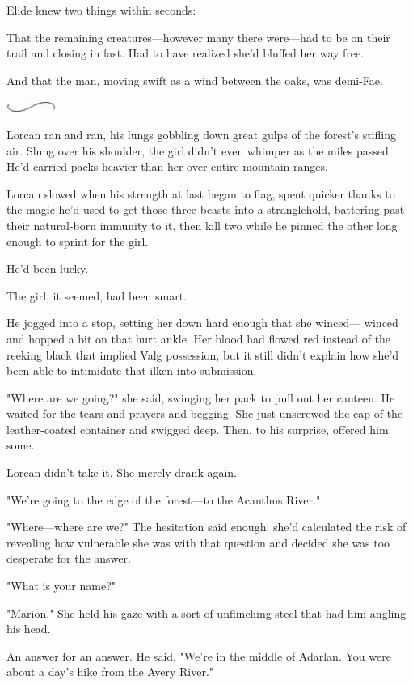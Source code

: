 Elide knew two things within seconds:

That the remaining creatures---however many there were---had to be on their trail and closing in fast. Had to have realized she'd bluffed her way free.

And that the man, moving swift as a wind between the oaks, was demi-Fae.

\includegraphics[width=0.65in,height=0.13in]{images/seperator}

Lorcan ran and ran, his lungs gobbling down great gulps of the forest's stifling air. Slung over his shoulder, the girl didn't even whimper as the miles passed. He'd carried packs heavier than her over entire mountain ranges.

Lorcan slowed when his strength at last began to flag, spent quicker thanks to the magic he'd used to get those three beasts into a stranglehold, battering past their natural-born immunity to it, then kill two while he pinned the other long enough to sprint for the girl.

He'd been lucky.

The girl, it seemed, had been smart.

He jogged into a stop, setting her down hard enough that she winced--- winced and hopped a bit on that hurt ankle. Her blood had flowed red instead of the reeking black that implied Valg possession, but it still didn't explain how she'd been able to intimidate that ilken into submission.

"Where are we going?" she said, swinging her pack to pull out her canteen. He waited for the tears and prayers and begging. She just unscrewed the cap of the leather-coated container and swigged deep. Then, to his surprise, offered him some.

Lorcan didn't take it. She merely drank again.

"We're going to the edge of the forest---to the Acanthus River."

"Where---where are we?" The hesitation said enough: she'd calculated the risk of revealing how vulnerable she was with that question 
and decided she was too desperate for the answer.

"What is your name?"

"Marion." She held his gaze with a sort of unflinching steel that had him angling his head.

An answer for an answer. He said, "We're in the middle of Adarlan. You were about a day's hike from the Avery River."

